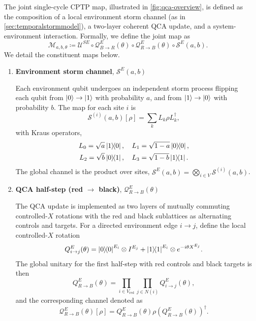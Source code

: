 \documentclass[
    aps,
    prx,
    reprint,
    superscriptaddress,
    longbibliography,
    nofootinbib,
    floatfix,
]{revtex4-2}
\newcommand{\ketbra}[2]{\ket{#1}\!\!\bra{#2}}  %
\begin{document}
The joint single-cycle CPTP map, illustrated in \cref{fig:qca-overview}, is defined as the composition of a local environment storm channel (as in \cref{sec:temporalstormmodel}), a two-layer coherent QCA update, and a system-environment interaction. Formally, we define the joint map as
\begin{equation}
    \mathcal{M}_{a, b, \theta} \coloneq \mathcal{U}^{SE} \circ \mathcal{Q}_{B\to R}^E(\theta) \circ \mathcal{Q}_{R\to B}^E(\theta) \circ \mathcal{S}^E (a, b).
\end{equation}
We detail the constituent maps below.
\begin{enumerate}
    \item \textbf{Environment storm channel}, \(\mathcal{S}^E(a, b)\)
    
    Each environment qubit undergoes an independent storm process flipping each qubit from \(\ket{0}\to\ket{1}\) with probability \(a\), and from \(\ket{1}\to\ket{0}\) with probability \(b\). The map for each site \(i\) is
    \begin{equation}
        \mathcal{S}^{(i)}(a, b)[\rho] = \sum_k L_k \rho L_k^\dagger,
    \end{equation}
    with Kraus operators,
    \begin{equation}
        \begin{gathered}
            L_0 = \sqrt{a}\ketbra{1}{0}, 
            \quad L_1 = \sqrt{1-a}\ketbra{0}{0}, 
            \\
            L_2 = \sqrt{b}\ketbra{0}{1}, 
            \quad L_3 = \sqrt{1-b}\ketbra{1}{1}.
        \end{gathered}
    \end{equation}
    The global channel is the product over sites, \(\mathcal{S}^E(a, b) = \bigotimes_{i\in V} \mathcal{S}^{(i)}(a, b)\).

    \item \textbf{QCA half-step (red \(\to\) black)}, \(\mathcal{Q}_{R\to B}^E(\theta)\)

    The QCA update is implemented as two layers of mutually commuting controlled-\(X\) rotations with the red and black sublattices as alternating controls and targets. For a directed environment edge \(i\to j\), define the local controlled-\(X\) rotation
    \begin{equation}
        Q^E_{i\to j}(\theta) = \ketbra{0}{0}^{E_i} \otimes I^{E_j} + \ketbra{1}{1}^{E_i} \otimes e^{-i\theta X^{E_j}}.
    \end{equation}
    The global unitary for the first half-step with red controls and black targets is then
    \begin{equation}
        Q^E_{R\to B}(\theta)
        = 
        \prod_{i\in V_\mathrm{red}} \prod_{j\in N(i)}
        Q^E_{i\to j}(\theta),
    \end{equation}
    and the corresponding channel denoted as
    \begin{equation}
        \mathcal{Q}_{R\to B}^E(\theta)[\rho] = Q^E_{R\to B}(\theta) \rho (Q^E_{R\to B}(\theta))^\dagger.
    \end{equation}


\end{enumerate}
\end{document}
